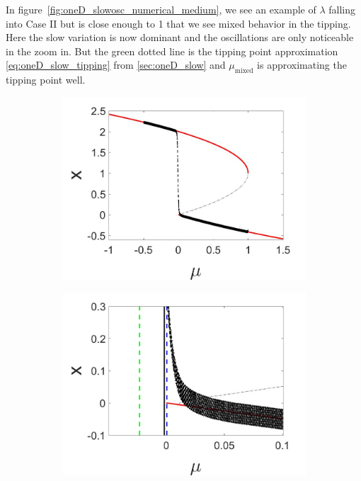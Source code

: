 In figure~\ref{fig:oneD_slowosc_numerical_medium}, we see an example of $\lambda$ falling into Case II but is close enough to 1 that we see mixed behavior in the tipping. Here the slow variation is now dominant and the oscillations are only noticeable in the zoom in. But the green dotted line is the tipping point approximation \eqref{eq:oneD_slow_tipping} from \autoref{sec:oneD_slow} and $\mu_{\text{mixed}}$ is approximating the tipping point well.

\begin{figure}[H]
\centering
\begin{subfigure}{.5\textwidth}
 \centering
 \includegraphics[width=\linewidth]{oneD/slowosc_bif_diagram_medium.jpg}
 \caption{}
\end{subfigure}%
\begin{subfigure}{.5\textwidth}
 \centering
 \includegraphics[width=\linewidth]{oneD/slowosc_bif_diagram_medium_zoom.jpg}

\end{subfigure}
\end{figure}
